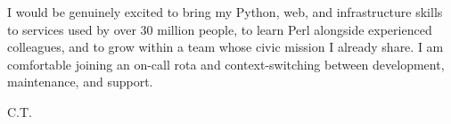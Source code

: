 \documentclass[11pt,a4paper]{article}
\begin{document}
I would be genuinely excited to bring my Python, web, and infrastructure
skills to services used by over 30 million people, to learn Perl alongside
experienced colleagues, and to grow within a team whose civic mission I
already share. I am comfortable joining an on-call rota and
context-switching between development, maintenance, and support.

\vspace{0.3em}
C.T.
\end{document}
